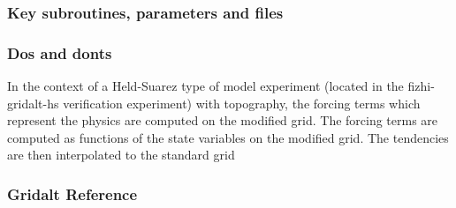 \subsubsection {Key subroutines, parameters and files } 

\subsubsection {Dos and donts}

In the context of a Held-Suarez type of model experiment (located
in the fizhi-gridalt-hs verification experiment) with
topography, the forcing terms which represent the physics are computed on 
the modified grid. The forcing terms are computed as functions of the
state variables on the modified grid. The tendencies are then interpolated
to the standard grid

\subsubsection {Gridalt Reference} 
